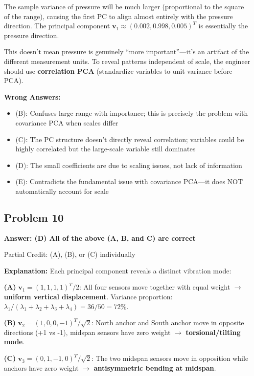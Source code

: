 \documentclass[12pt]{amsart}
\newcommand{\correct}[1]{{\color{correctgreen}\textbf{#1}}}
\newcommand{\partcred}[1]{{\color{partialblue}#1}}
\begin{document}
\begin{itemize}
The sample variance of pressure will be much larger (proportional to the square of the range), causing the first PC to align almost entirely with the pressure direction. The principal component $\mathbf{v}_1 \approx (0.002, 0.998, 0.005)^T$ is essentially the pressure direction.

This doesn't mean pressure is genuinely ``more important''---it's an artifact of the different measurement units. To reveal patterns independent of scale, the engineer should use \textbf{correlation PCA} (standardize variables to unit variance before PCA).

\textbf{Wrong Answers:}
\begin{itemize}
\item (B): Confuses large range with importance; this is precisely the problem with covariance PCA when scales differ
\item (C): The PC structure doesn't directly reveal correlation; variables could be highly correlated but the large-scale variable still dominates
\item (D): The small coefficients are due to scaling issues, not lack of information
\item (E): Contradicts the fundamental issue with covariance PCA---it does NOT automatically account for scale
\end{itemize}

\subsection*{Problem 10}
\correct{Answer: (D) All of the above (A, B, and C) are correct}

\partcred{Partial Credit: (A), (B), or (C) individually}

\textbf{Explanation:} Each principal component reveals a distinct vibration mode:

\textbf{(A)} $\mathbf{v}_1 = (1,1,1,1)^T/2$: All four sensors move together with equal weight $\to$ \textbf{uniform vertical displacement}. 
Variance proportion: $\lambda_1/(\lambda_1+\lambda_2+\lambda_3+\lambda_4) = 36/50 = 72\%$. \checkmark

\textbf{(B)} $\mathbf{v}_2 = (1,0,0,-1)^T/\sqrt{2}$: North anchor and South anchor move in opposite directions (+1 vs -1), midspan sensors have zero weight $\to$ \textbf{torsional/tilting mode}. \checkmark

\textbf{(C)} $\mathbf{v}_3 = (0,1,-1,0)^T/\sqrt{2}$: The two midspan sensors move in opposition while anchors have zero weight $\to$ \textbf{antisymmetric bending at midspan}. \checkmark


\end{itemize}
\end{document}
